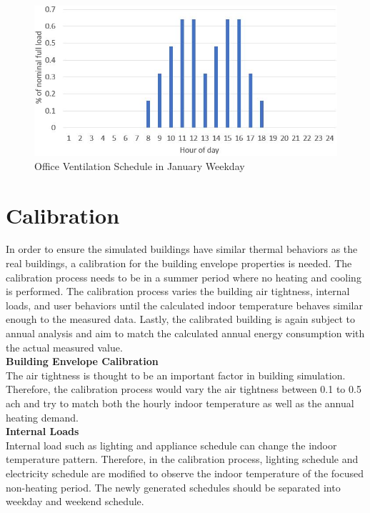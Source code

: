 \documentclass[a4paper, oneside]{discothesis}
\begin{document}
		\begin{figure}[h!]
		\centering
		\includegraphics[scale=0.7]{figures/JanOffice_Vent.jpg}
		\caption{Office Ventilation Schedule in January Weekday}
		\label{fig:JanOffice_Vent}
		\end{figure}
		
	\section{Calibration}
		In order to ensure the simulated buildings have similar thermal behaviors as the real buildings, a calibration for the building envelope properties is needed. The calibration process needs to be in a summer period where no heating and cooling is performed. The calibration process varies the building air tightness, internal loads, and user behaviors until the calculated indoor temperature behaves similar enough to the measured data. Lastly, the calibrated building is again subject to annual analysis and aim to match the calculated annual energy consumption with the actual measured value.\\
		
		

		\textbf{Building Envelope Calibration}\\
			The air tightness is thought to be an important factor in building simulation. Therefore, the calibration process would vary the air tightness between 0.1 to 0.5 ach and try to match both the hourly indoor temperature as well as the annual heating demand.\\


		\textbf{Internal Loads}\\
			Internal load such as lighting and appliance schedule can change the indoor temperature pattern. Therefore, in the calibration process, lighting schedule and electricity schedule are modified to observe the indoor temperature of the focused non-heating period. The newly generated schedules should be separated into weekday and weekend schedule.\\
\end{document}

